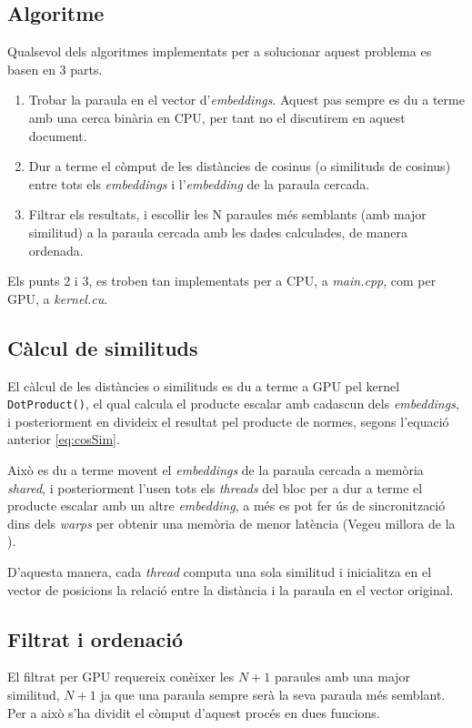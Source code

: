 \documentclass[catalan,10pt,a4paper]{article}
\begin{document}
\subsection*{Algoritme}
Qualsevol dels algoritmes implementats per a solucionar aquest problema es basen en 3 parts.
\begin{enumerate}
	\item Trobar la paraula en el vector d'\textit{embeddings}. Aquest pas sempre es du a terme amb una cerca binària en CPU, per tant no el discutirem en aquest document.
	\item Dur a terme el còmput de les distàncies de cosinus (o similituds de cosinus) entre tots els \textit{embeddings} i l'\textit{embedding} de la paraula cercada.
	\item Filtrar els resultats, i escollir les N paraules més semblants (amb major similitud) a la paraula cercada amb les dades calculades, de manera ordenada.
\end{enumerate}

Els punts 2 i 3, es troben tan implementats per a CPU, a \textit{main.cpp}, com per GPU, a \textit{kernel.cu}.

\subsection*{Càlcul de similituds}
El càlcul de les distàncies o similituds es du a terme a GPU pel kernel \verb|DotProduct()|, el qual calcula el producte escalar amb cadascun dels \textit{embeddings}, i posteriorment en divideix el resultat pel producte de normes, segons l'equació anterior \ref{eq:cosSim}.

Això es du a terme movent el \textit{embeddings} de la paraula cercada a memòria \textit{shared}, i posteriorment l'usen tots els \textit{threads} del bloc per a dur a terme el producte escalar amb un altre \textit{embedding}, a més es pot fer ús de sincronització dins dels \textit{warps} per obtenir una memòria de menor latència (Vegeu millora de la ).

D'aquesta manera, cada \textit{thread} computa una sola similitud i inicialitza en el vector de posicions la relació entre la distància i la paraula en el vector original.

\subsection*{Filtrat i ordenació}
El filtrat per GPU requereix conèixer les $N+1$ paraules amb una major similitud, $N+1$ ja que una paraula sempre serà la seva paraula més semblant. Per a això s'ha dividit el còmput d'aquest procés en dues funcions.
\end{document}
